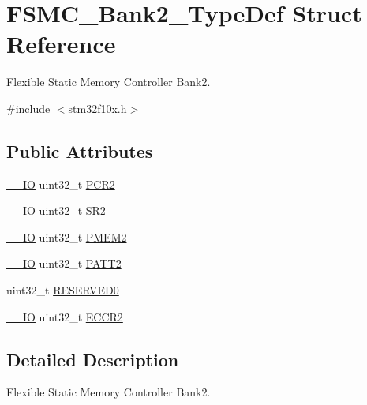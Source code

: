 \hypertarget{struct_f_s_m_c___bank2___type_def}{}\section{F\+S\+M\+C\+\_\+\+Bank2\+\_\+\+Type\+Def Struct Reference}
\label{struct_f_s_m_c___bank2___type_def}


Flexible Static Memory Controller Bank2.  




{\ttfamily \#include $<$stm32f10x.\+h$>$}

\subsection*{Public Attributes}
\begin{DoxyCompactItemize}
\item 
\hyperlink{core__sc300_8h_aec43007d9998a0a0e01faede4133d6be}{\+\_\+\+\_\+\+IO} uint32\+\_\+t \hyperlink{struct_f_s_m_c___bank2___type_def_ad1eabc89a4eadb5cc6a42c1e39a39ff8}{P\+C\+R2}
\item 
\hyperlink{core__sc300_8h_aec43007d9998a0a0e01faede4133d6be}{\+\_\+\+\_\+\+IO} uint32\+\_\+t \hyperlink{struct_f_s_m_c___bank2___type_def_a38ad7403e05c899dc266cf47f932cc8f}{S\+R2}
\item 
\hyperlink{core__sc300_8h_aec43007d9998a0a0e01faede4133d6be}{\+\_\+\+\_\+\+IO} uint32\+\_\+t \hyperlink{struct_f_s_m_c___bank2___type_def_a29b2b75e74520e304e31c18cf9e4a7f8}{P\+M\+E\+M2}
\item 
\hyperlink{core__sc300_8h_aec43007d9998a0a0e01faede4133d6be}{\+\_\+\+\_\+\+IO} uint32\+\_\+t \hyperlink{struct_f_s_m_c___bank2___type_def_a9b2c273e4b84f24efbd731bd4ba76a84}{P\+A\+T\+T2}
\item 
uint32\+\_\+t \hyperlink{struct_f_s_m_c___bank2___type_def_ac0433330a92f2bd04812384f63bb4a52}{R\+E\+S\+E\+R\+V\+E\+D0}
\item 
\hyperlink{core__sc300_8h_aec43007d9998a0a0e01faede4133d6be}{\+\_\+\+\_\+\+IO} uint32\+\_\+t \hyperlink{struct_f_s_m_c___bank2___type_def_afebea17b3ac79d86ad59ce299ab5dd83}{E\+C\+C\+R2}
\end{DoxyCompactItemize}


\subsection{Detailed Description}
Flexible Static Memory Controller Bank2. 


